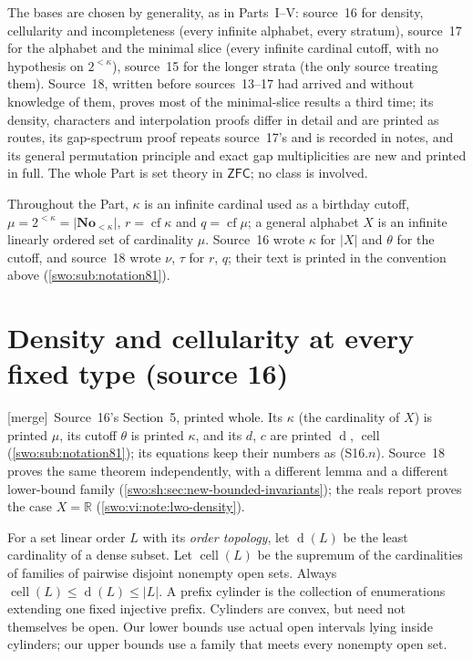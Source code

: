 \documentclass[11pt]{article}
\theoremstyle{definition}
\theoremstyle{remark}
\newcommand{\No}{\mathbf{No}}
\newcommand{\cf}{\operatorname{cf}}
\newcommand{\ZFC}{\mathsf{ZFC}}
\newcommand{\card}[1]{\lvert #1\rvert}
\newcommand{\merge}{\textsf{[merge]}}
\newcommand{\dens}{\operatorname{d}}
\newcommand{\cell}{\operatorname{cell}}
\begin{document}
The bases are chosen by generality, as in Parts~I--V: source~16 for density,
cellularity and incompleteness (every infinite alphabet, every stratum),
source~17 for the alphabet and the minimal slice (every infinite cardinal
cutoff, with no hypothesis on $2^{<\kappa}$), source~15 for the longer strata
(the only source treating them). Source~18, written before sources~13--17 had
arrived and without knowledge of them, proves most of the minimal-slice
results a third time; its density, characters and interpolation proofs differ
in detail and are printed as routes, its gap-spectrum proof repeats
source~17's and is recorded in notes, and its general permutation principle
and exact gap multiplicities are new and printed in full. The whole Part is
set theory in $\ZFC$; no class is involved.

Throughout the Part, $\kappa$ is an infinite cardinal used as a birthday
cutoff, $\mu=2^{<\kappa}=\card{\No_{<\kappa}}$, $r=\cf\kappa$ and
$q=\cf\mu$; a general alphabet $X$ is an infinite linearly ordered set of
cardinality $\mu$. Source~16 wrote $\kappa$ for $\card X$ and $\theta$ for the
cutoff, and source~18 wrote $\nu$, $\tau$ for $r$, $q$; their text is printed
in the convention above (\cref{swo:sub:notation81}).

\section{Density and cellularity at every fixed type (source 16)}\label{swo:ds:sec:topology}

\merge\ Source~16's Section~5, printed whole. Its $\kappa$ (the cardinality
of $X$) is printed $\mu$, its cutoff $\theta$ is printed $\kappa$, and its
$d$, $c$ are printed $\dens$, $\cell$ (\cref{swo:sub:notation81}); its
equations keep their numbers as (S16.$n$). Source~18 proves the same theorem
independently, with a different lemma and a different lower-bound family
(\cref{swo:sh:sec:new-bounded-invariants}); the reals report proves the case
$X=\mathbb R$ (\cref{swo:vi:note:lwo-density}).


For a set linear order $L$ with its \emph{order topology}, let $\dens(L)$ be the
least cardinality of a dense subset. Let $\cell(L)$ be the supremum of the
cardinalities of families of pairwise disjoint nonempty open sets.
Always $\cell(L)\le \dens(L)\le|L|$. A prefix cylinder is the collection of
enumerations extending one fixed injective prefix. Cylinders are convex,
but need not themselves be open. Our lower bounds use actual open
intervals lying inside cylinders; our upper bounds use a family that meets
every nonempty open set.
\end{document}

